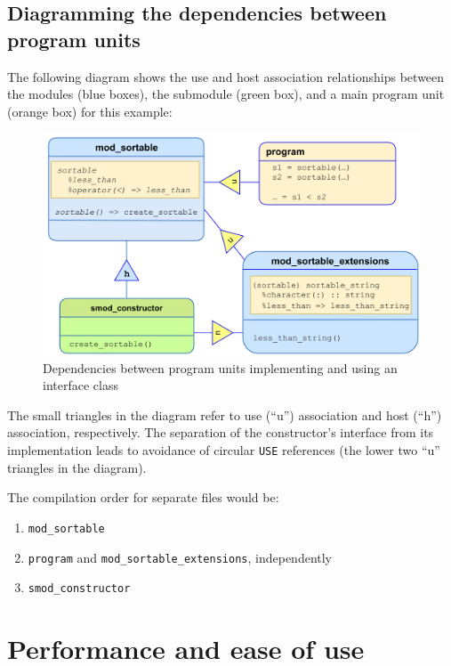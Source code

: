 \documentclass[
  paper=a4,
  ,captions=tableheading
]{scrartcl}
\providecommand{\tightlist}{%
  \setlength{\itemsep}{0pt}\setlength{\parskip}{0pt}}
\begin{document}
\subsection{Diagramming the dependencies between program
units}\label{diagramming-the-dependencies-between-program-units}

The following diagram shows the use and host association relationships
between the modules (blue boxes), the submodule (green box), and a main
program unit (orange box) for this example:

\begin{figure}
\centering
\includegraphics[width=5in,height=\textheight,keepaspectratio]{./images/Dependency_inversion.png}
\caption{Dependencies between program units implementing and using an
interface class}
\end{figure}

The small triangles in the diagram refer to use (``u'') association and
host (``h'') association, respectively. The separation of the
constructor's interface from its implementation leads to avoidance of
circular \texttt{USE} references (the lower two ``u'' triangles in the
diagram).

The compilation order for separate files would be:

\begin{enumerate}
\def\labelenumi{\arabic{enumi}.}
\tightlist
\item
  \texttt{mod\_sortable}
\item
  \texttt{program} and \texttt{mod\_sortable\_extensions}, independently
\item
  \texttt{smod\_constructor}
\end{enumerate}

\section{Performance and ease of use}\label{performance-and-ease-of-use}
\end{document}
